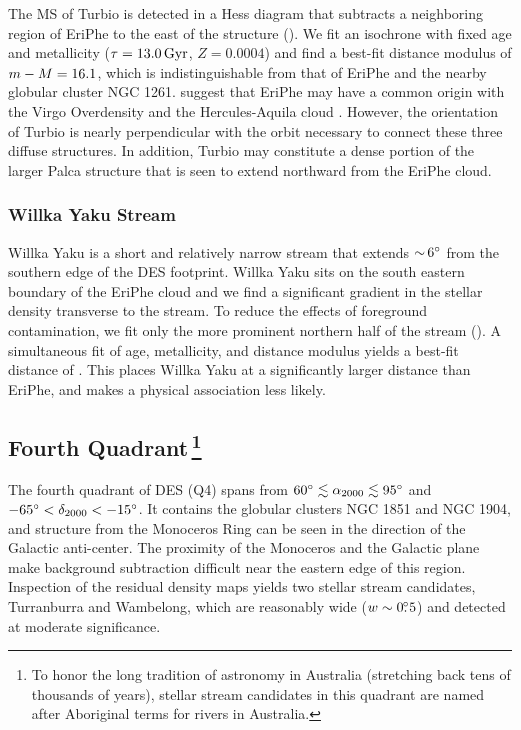 \documentclass[twocolumn]{aastex61}
\begin{document}
The MS of Turbio is detected in a Hess diagram that subtracts a neighboring region of EriPhe to the east of the structure ().
We fit an isochrone with fixed age and metallicity (${\tau} = 13.0\mathrm{\,Gyr}$, $Z=0.0004$) and find a best-fit distance modulus of $m - M = 16.1$, which is indistinguishable from that of EriPhe and the nearby globular cluster NGC 1261.
\citet{Li:2016} suggest that EriPhe may have a common origin with the Virgo Overdensity \citep{Juric:2008} and the Hercules-Aquila cloud \citep{Belokurov:2007c}.
However, the orientation of Turbio is nearly perpendicular with the orbit necessary to connect these three diffuse structures.
In addition, Turbio may constitute a dense portion of the larger Palca structure that is seen to extend northward from the EriPhe cloud.



\subsubsection{Willka Yaku Stream}
\label{sec:reticulum}

Willka Yaku is a short and relatively narrow stream that extends $ {\sim}\, 6{}^{\circ}$ from the southern edge of the DES footprint.
Willka Yaku sits on the south eastern boundary of the EriPhe cloud and we find a significant gradient in the stellar density transverse to the stream.
To reduce the effects of foreground contamination, we fit only the more prominent northern half of the stream ().
A simultaneous fit of age, metallicity, and distance modulus yields a best-fit distance of .
This places Willka Yaku at a significantly larger distance than EriPhe, and makes a  physical association less likely.

\subsection{Fourth Quadrant\,\footnote{To honor the long tradition of astronomy in Australia (stretching back tens of thousands of years), stellar stream candidates in this quadrant are named after Aboriginal terms for rivers in Australia.}}
\label{sec:q4}

The fourth quadrant of DES (Q4) spans from $60{}^{\circ} \lesssim {\ensuremath{\alpha_{2000}}} \lesssim 95{}^{\circ}$ and $-65{}^{\circ} < {\delta_{2000}} < -15{}^{\circ}$.
It contains the globular clusters NGC 1851 and NGC 1904, and structure from the Monoceros Ring can be seen in the direction of the Galactic anti-center. 
The proximity of the Monoceros and the Galactic plane make background subtraction difficult near the eastern edge of this region.
Inspection of the residual density maps yields two stellar stream candidates, Turranburra and Wambelong, which are reasonably wide ($w \sim 0\mbox{$.\!\!^\circ$}5$) and detected at moderate significance.
\end{document}
